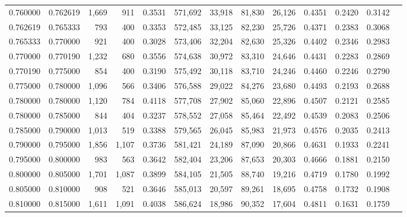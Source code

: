 \begin{tabular}{rrrrrrrrrrrrr}
0.760000 & 0.762619 &  1,669 &   911 &                                     0.3531 & 571,692 &  33,918 &  81,830 &  26,126 & 0.4351 & 0.2420 & 0.3142 \\
0.762619 & 0.765333 &    793 &   400 &                                     0.3353 & 572,485 &  33,125 &  82,230 &  25,726 & 0.4371 & 0.2383 & 0.3068 \\
0.765333 & 0.770000 &    921 &   400 &                                     0.3028 & 573,406 &  32,204 &  82,630 &  25,326 & 0.4402 & 0.2346 & 0.2983 \\
0.770000 & 0.770190 &  1,232 &   680 &                                     0.3556 & 574,638 &  30,972 &  83,310 &  24,646 & 0.4431 & 0.2283 & 0.2869 \\
0.770190 & 0.775000 &    854 &   400 &                                     0.3190 & 575,492 &  30,118 &  83,710 &  24,246 & 0.4460 & 0.2246 & 0.2790 \\
0.775000 & 0.780000 &  1,096 &   566 &                                     0.3406 & 576,588 &  29,022 &  84,276 &  23,680 & 0.4493 & 0.2193 & 0.2688 \\
0.780000 & 0.780000 &  1,120 &   784 &                                     0.4118 & 577,708 &  27,902 &  85,060 &  22,896 & 0.4507 & 0.2121 & 0.2585 \\
0.780000 & 0.785000 &    844 &   404 &                                     0.3237 & 578,552 &  27,058 &  85,464 &  22,492 & 0.4539 & 0.2083 & 0.2506 \\
0.785000 & 0.790000 &  1,013 &   519 &                                     0.3388 & 579,565 &  26,045 &  85,983 &  21,973 & 0.4576 & 0.2035 & 0.2413 \\
0.790000 & 0.795000 &  1,856 & 1,107 &                                     0.3736 & 581,421 &  24,189 &  87,090 &  20,866 & 0.4631 & 0.1933 & 0.2241 \\
0.795000 & 0.800000 &    983 &   563 &                                     0.3642 & 582,404 &  23,206 &  87,653 &  20,303 & 0.4666 & 0.1881 & 0.2150 \\
0.800000 & 0.805000 &  1,701 & 1,087 &                                     0.3899 & 584,105 &  21,505 &  88,740 &  19,216 & 0.4719 & 0.1780 & 0.1992 \\
0.805000 & 0.810000 &    908 &   521 &                                     0.3646 & 585,013 &  20,597 &  89,261 &  18,695 & 0.4758 & 0.1732 & 0.1908 \\
0.810000 & 0.815000 &  1,611 & 1,091 &                                     0.4038 & 586,624 &  18,986 &  90,352 &  17,604 & 0.4811 & 0.1631 & 0.1759 \\

\end{tabular}
